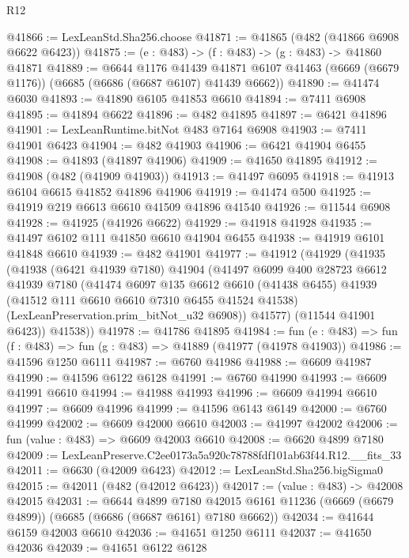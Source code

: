 \begin{lexlean}{R12}
\begin{coremodule}
@41866 := LexLeanStd.Sha256.choose
@41871 := @41865 (@482 (@41866 @6908 @6622 @6423))
@41875 := (e : @483) -> (f : @483) -> (g : @483) -> @41860 @41871
@41889 := @6644
    @1176
    @41439
    @41871
    @6107
    @41463
    (@6669 (@6679 @1176))
    (@6685 (@6686 (@6687 @6107) @41439 @6662))
@41890 := @41474 @6030
@41893 := @41890 @6105 @41853 @6610
@41894 := @7411 @6908
@41895 := @41894 @6622
@41896 := @482 @41895
@41897 := @6421 @41896
@41901 := LexLeanRuntime.bitNot @483 @7164 @6908
@41903 := @7411 @41901 @6423
@41904 := @482 @41903
@41906 := @6421 @41904 @6455
@41908 := @41893 (@41897 @41906)
@41909 := @41650 @41895
@41912 := @41908 (@482 (@41909 @41903))
@41913 := @41497 @6095
@41918 := @41913 @6104 @6615 @41852 @41896 @41906
@41919 := @41474 @500
@41925 := @41919 @219 @6613 @6610 @41509 @41896 @41540
@41926 := @11544 @6908
@41928 := @41925 (@41926 @6622)
@41929 := @41918 @41928
@41935 := @41497 @6102 @111 @41850 @6610 @41904 @6455
@41938 := @41919 @6101 @41848 @6610
@41939 := @482 @41901
@41977 := @41912
    (@41929
      (@41935
        (@41938
          (@6421 @41939 @7180)
          @41904
          (@41497
            @6099
            @400
            @28723
            @6612
            @41939
            @7180
            (@41474
              @6097
              @135
              @6612
              @6610
              (@41438 @6455)
              @41939
              (@41512 @111 @6610 @6610 @7310 @6455 @41524 @41538)
              (LexLeanPreservation.prim_bitNot_u32 @6908))
            @41577)
          (@11544 @41901 @6423))
        @41538))
@41978 := @41786 @41895
@41984 := fun (e : @483) => fun (f : @483) => fun (g : @483) => @41889 (@41977 (@41978 @41903))
@41986 := @41596 @1250 @6111
@41987 := @6760 @41986
@41988 := @6609 @41987
@41990 := @41596 @6122 @6128
@41991 := @6760 @41990
@41993 := @6609 @41991 @6610
@41994 := @41988 @41993
@41996 := @6609 @41994 @6610
@41997 := @6609 @41996
@41999 := @41596 @6143 @6149
@42000 := @6760 @41999
@42002 := @6609 @42000 @6610
@42003 := @41997 @42002
@42006 := fun (value : @483) => @6609 @42003 @6610
@42008 := @6620 @4899 @7180
@42009 := LexLeanPreserve.C2ee0173a5a920c78788fdf101ab63f44.R12.__fits_33
@42011 := @6630 (@42009 @6423)
@42012 := LexLeanStd.Sha256.bigSigma0
@42015 := @42011 (@482 (@42012 @6423))
@42017 := (value : @483) -> @42008 @42015
@42031 := @6644
    @4899
    @7180
    @42015
    @6161
    @11236
    (@6669 (@6679 @4899))
    (@6685 (@6686 (@6687 @6161) @7180 @6662))
@42034 := @41644 @6159 @42003 @6610
@42036 := @41651 @1250 @6111
@42037 := @41650 @42036
@42039 := @41651 @6122 @6128

\end{coremodule}
\end{lexlean}
